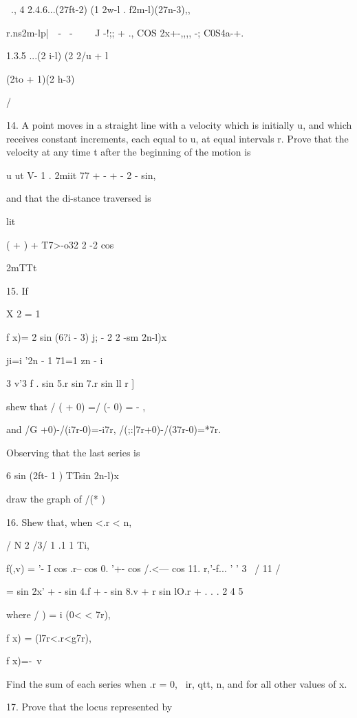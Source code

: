   \ ., 4 2.4.6...(27ft-2) (1 2w-l . f2m-l)(27n-3),,

r.ns2m-l\;p|\ \ - \ - \ \ \ \ J -!;; + ., COS 2x+-,,,, -;
C0S4a-+.

1.3.5 ...(2 i-l) (2 2/u + l

(2to + 1)(2 h-3)

/

14. A point moves in a straight line with a velocity which is
initially u, and which receives constant increments, each equal to u,
at equal intervals r. Prove that the velocity at any time t after the
beginning of the motion is

u ut V- 1 . 2miit 77 + - + - 2 - sin,

and that the di-stance traversed is

lit

( + ) + T7>-o32 2 -2 cos

2mTTt


%
%

15. If

X 2 = 1

f x)= 2 sin (6?i - 3) j; - 2 2 -sm 2n-l)x

ji=i '2n - 1 71=1 zn - i

3 v'3 f . sin 5.r sin 7.r sin ll r ]

shew that / ( + 0) =/ (\pi - 0) = - \pi,

and /G +0)-/(i7r-0)=-i7r, /(;:|7r+0)-/(37r-0)=*7r.

Observing that the last series is

6 sin (2ft- 1 ) TTsin 2n-l)x

draw the graph of /(* ) 

16. Shew that, when <.r < n,

 / N 2 /3/ 1 .1 1 Ti, \

f(,v) = '- I cos .r-- cos 0. '+- cos /.<--- cos 11. r,'-f... ' ' 3 \
/ 11 /

= sin 2x' + - sin 4.f + - sin 8.v + r sin lO.r + . . . 2 4 5

where / ) = i (0< < 7r),

f x) = (l7r<.r<g7r),

f x)=-\ v %

Find the sum of each series when .r = 0, \ ir, qtt, n, and for all
other values of x.


17. Prove that the locus represented by

